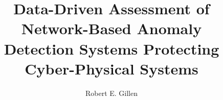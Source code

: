 \documentclass[11pt, twoside]{report}
\title{Data-Driven Assessment of Network-Based Anomaly \\ Detection Systems Protecting \\ Cyber-Physical Systems} %
\author{Robert E. Gillen} %
\newcounter{appendix}
\begin{document}
                         
\beforepreface         %
\dedicationpage        %
\acknowledgmentspage   %
  
\afterpreface          %
%
\ttutext               %









\appendixnodots



\end{document}
